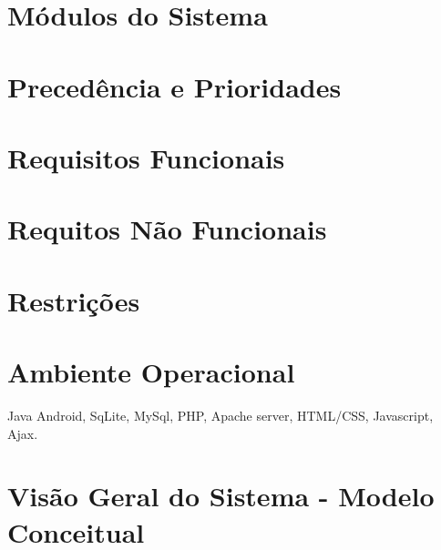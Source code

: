 \documentclass[13pt]{article}
\begin{document}
\section*{Módulos do Sistema}
\section*{Precedência e Prioridades}
\section*{Requisitos Funcionais}
\section*{Requitos Não Funcionais}
\section*{Restrições}
\section*{Ambiente Operacional}
Java Android, SqLite, MySql, PHP, Apache server, HTML/CSS, Javascript, Ajax.
\section*{Visão Geral do Sistema - Modelo Conceitual}


    
\end{document}
